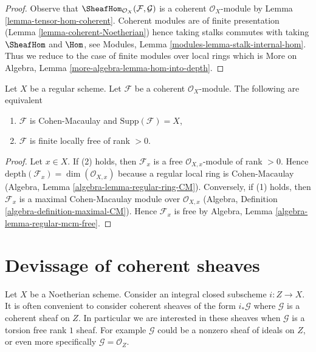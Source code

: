 \begin{proof}
Observe that $\SheafHom_{\mathcal{O}_X}(\mathcal{F}, \mathcal{G})$ is
a coherent $\mathcal{O}_X$-module by Lemma \ref{lemma-tensor-hom-coherent}.
Coherent modules are of finite presentation
(Lemma \ref{lemma-coherent-Noetherian}) hence taking stalks commutes
with taking $\SheafHom$ and $\Hom$, see
Modules, Lemma \ref{modules-lemma-stalk-internal-hom}.
Thus we reduce to the case of finite modules over local
rings which is More on Algebra, Lemma \ref{more-algebra-lemma-hom-into-depth}.
\end{proof}

\begin{lemma}
\label{lemma-Cohen-Macaulay-over-regular}
Let $X$ be a regular scheme. Let $\mathcal{F}$ be a coherent
$\mathcal{O}_X$-module. The following are equivalent
\begin{enumerate}
\item $\mathcal{F}$ is Cohen-Macaulay and $\text{Supp}(\mathcal{F}) = X$,
\item $\mathcal{F}$ is finite locally free of rank $>0$.
\end{enumerate}
\end{lemma}

\begin{proof}
Let $x \in X$. If (2) holds, then $\mathcal{F}_x$ is a free
$\mathcal{O}_{X, x}$-module of rank $> 0$. Hence
$\text{depth}(\mathcal{F}_x) = \dim(\mathcal{O}_{X, x})$
because a regular local ring is Cohen-Macaulay
(Algebra, Lemma \ref{algebra-lemma-regular-ring-CM}).
Conversely, if (1) holds, then $\mathcal{F}_x$ is a
maximal Cohen-Macaulay module over $\mathcal{O}_{X, x}$
(Algebra, Definition \ref{algebra-definition-maximal-CM}).
Hence $\mathcal{F}_x$ is free by
Algebra, Lemma \ref{algebra-lemma-regular-mcm-free}.
\end{proof}









\section{Devissage of coherent sheaves}
\label{section-devissage}

\noindent
Let $X$ be a Noetherian scheme. Consider an integral closed subscheme
$i : Z \to X$. It is often convenient to consider coherent sheaves of
the form $i_*\mathcal{G}$ where $\mathcal{G}$ is a coherent sheaf on
$Z$. In particular we are interested in these sheaves when $\mathcal{G}$
is a torsion free rank $1$ sheaf. For example $\mathcal{G}$ could be
a nonzero sheaf of ideals on $Z$, or even more specifically
$\mathcal{G} = \mathcal{O}_Z$.

